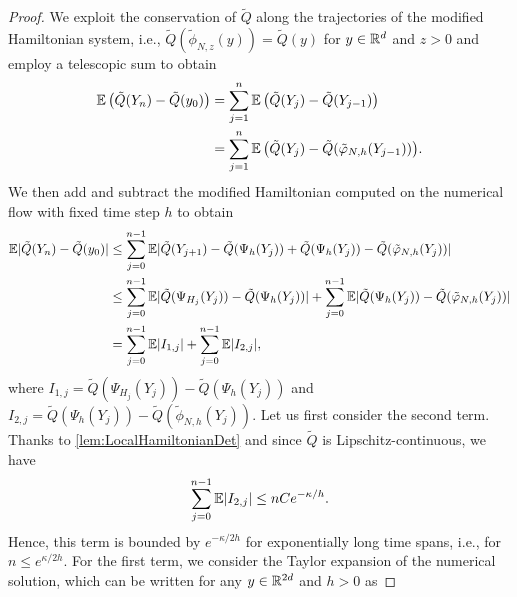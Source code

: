 \documentclass[final,onefignum,onetabnum]{siamonline171218}
\begin{document}
\begin{proof} We exploit the conservation of $\tilde Q$ along the trajectories of the modified Hamiltonian system, i.e., $\tilde Q (\tilde \phi_{N,z} (y)) = \tilde Q(y)$ for $y \in \mathbb{R}^d$ and $z > 0$ and employ a telescopic sum to obtain
	\begin{equation}
	\begin{aligned}
	\operatorname{\mathbb{E}} \big(\tilde Q(Y_n) - \tilde Q(y_0)\big) &= \sum_{j=1}^{n} \operatorname{\mathbb{E}}\big(\tilde Q(Y_{j}) - \tilde Q(Y_{j-1})\big) \\
	&= \sum_{j=1}^{n} \operatorname{\mathbb{E}} \big(\tilde Q(Y_j) - \tilde Q(\tilde{\varphi}_{N, h}(Y_{j-1}))\big).
	\end{aligned}
	\end{equation}
	We then add and subtract the modified Hamiltonian computed on the numerical flow with fixed time step $h$ to obtain
	\begin{equation}
	\begin{aligned}
	\operatorname{\mathbb{E}} \lvert\tilde Q(Y_n) - \tilde Q(y_0)\rvert &\leq \sum_{j=0}^{n-1} \operatorname{\mathbb{E}} \lvert\tilde Q(Y_{j+1}) - \tilde Q(\Psi_h(Y_j)) + \tilde Q(\Psi_h(Y_j)) - \tilde Q(\tilde{\varphi}_{N, h}(Y_j))\rvert \\
	&\leq \sum_{j=0}^{n-1} \operatorname{\mathbb{E}} \lvert\tilde Q(\Psi_{H_j}(Y_j)) - \tilde Q(\Psi_h(Y_j))\rvert + \sum_{j=0}^{n-1} \operatorname{\mathbb{E}} \lvert\tilde Q(\Psi_h(Y_j)) - \tilde Q(\tilde{\varphi}_{N, h}(Y_j))\rvert\\
	&= \sum_{j=0}^{n-1} \operatorname{\mathbb{E}} \lvert I_{1,j}\rvert + \sum_{j=0}^{n-1} \operatorname{\mathbb{E}} \lvert I_{2,j}\rvert,
	\end{aligned}
	\end{equation}
	where $I_{1,j} = \tilde Q(\Psi_{H_j}(Y_j)) - \tilde Q(\Psi_h(Y_j))$ and $I_{2,j} = \tilde Q(\Psi_h(Y_j)) - \tilde Q(\tilde\phi_{N, h}(Y_j))$.
	Let us first consider the second term. Thanks to \cref{lem:LocalHamiltonianDet} and since $\tilde Q$ is Lipschitz-continuous, we have
	\begin{equation}
	\sum_{j=0}^{n-1} \operatorname{\mathbb{E}} \lvert I_{2,j}\rvert \leq nC e^{-\kappa/h}.
	\end{equation}
	Hence, this term is bounded by $e^{-\kappa/2h}$ for exponentially long time spans, i.e., for $n \leq e^{\kappa/2h}$. For the first term, we consider the Taylor expansion of the numerical solution, which can be written for any $y \in \mathbb{R}^{2d}$ and $h > 0$ as

\end{proof}
\end{document}
